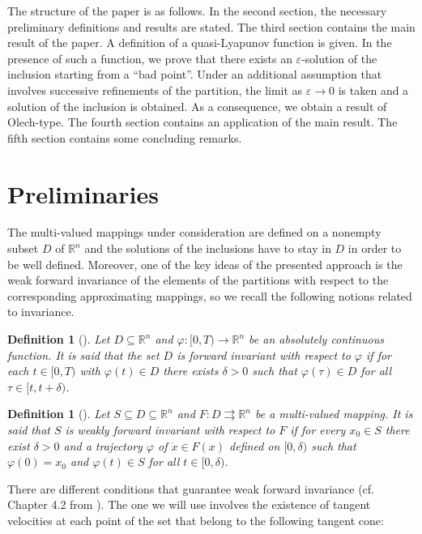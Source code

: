 \documentclass[a4paper]{article}
\newtheorem{definition}[thm]{Definition}
\begin{document}
The structure of the paper is as follows. In the second section, the necessary preliminary definitions and results are stated. The third section contains the main result of the paper. A definition of a quasi-Lyapunov function is given. In the presence of such a function, we prove that there exists an $\varepsilon$-solution of the inclusion starting from a ``bad point''. Under an additional assumption that involves successive refinements of the partition, the limit as $\varepsilon \to 0$ is taken and a solution of the inclusion is obtained. As a consequence, we obtain a result of Olech-type. The fourth section contains an application of the main result. The fifth section contains some concluding remarks.

\section{Preliminaries}

The multi-valued mappings under consideration are defined on a nonempty subset $D$ of $\mathbb{R}^n$ and the solutions of the inclusions have to stay in $D$ in order to be well defined. Moreover, one of the key ideas of the presented approach is the weak forward invariance of the elements of the partitions with respect to the corresponding approximating mappings, so we recall the following notions related to invariance.

\begin{definition}[\cite{KR}]
    Let $D \subseteq \mathbb{R}^n$ and $\varphi:[0,T) \to \mathbb{R}^n$ be an absolutely continuous function. It is said that the set $D$ is forward invariant with respect to $\varphi$ if for each $t \in [0,T)$ with $\varphi(t) \in D$ there exists $\delta>0$ such that $\varphi(\tau) \in D$ for all $\tau \in [t,t+\delta)$.
\end{definition}

\begin{definition}[\cite{CLSW}]
    Let $S \subseteq D \subseteq \mathbb{R}^n$ and $F: D \rightrightarrows \mathbb{R}^n$ be a multi-valued mapping. It is said that $S$ is weakly forward invariant with respect to $F$ if for every $x_0 \in S$ there exist $\delta > 0$ and a trajectory $\varphi$ of $\dot{x} \in F(x)$ defined on $[0,\delta)$ such that $\varphi(0)=x_0$ and $\varphi(t) \in S$ for all $t \in [0,\delta)$.
\end{definition}

There are different conditions that guarantee weak forward invariance (cf. Chapter 4.2 from \cite{CLSW}). The one we will use involves the existence of tangent velocities at each point of the set that belong to the following tangent cone:
\end{document}
